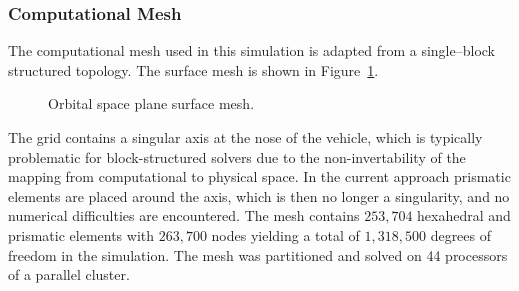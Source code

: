 \subsubsection{Computational Mesh}
The computational mesh used in this simulation is adapted from a single--block structured topology.  The surface mesh is shown in Figure~\ref{fig:osp_schematic_mesh}.
\begin{figure}[hbtp]
  \begin{center}
    \caption{Orbital space plane surface mesh.}
    \label{fig:osp_schematic_mesh}
  \end{center}
\end{figure}
The grid contains a singular axis at the nose of the vehicle, which is typically problematic for block-structured solvers due to the non-invertability of the mapping from computational to physical space.  In the current approach prismatic elements are placed around the axis, which is then no longer a singularity, and no numerical difficulties are encountered.  The mesh contains  $253,704$ hexahedral and prismatic elements with $263,700$ nodes yielding a total of $1,318,500$ degrees of freedom in the simulation. The mesh was partitioned and solved on 44 processors of a parallel cluster.

